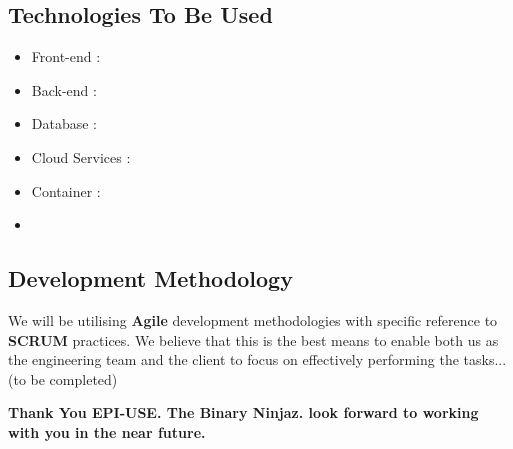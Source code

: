 \documentclass[11pt]{article}
\begin{document}
\subsection{Technologies To Be Used}
\begin{itemize}
\item Front-end : 
\item Back-end : 
\item Database : 
\item Cloud Services : 
\item Container : 
\item 
\end{itemize}



\subsection{Development Methodology}
We will be utilising \textbf{Agile} development methodologies with specific reference to \textbf{SCRUM} practices. We believe that this is the best means to enable both us as the engineering team and the client to focus on effectively performing the tasks...(to be completed)

 
\begin{center}
{\sffamily\bfseries
\large Thank You EPI-USE. The Binary Ninjaz. look forward to working with you in the near future.
}
\end{center}
\end{document}
